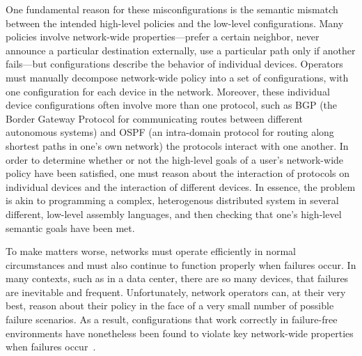 

One fundamental reason for these misconfigurations is the
semantic mismatch between the intended high-level
policies and the low-level configurations.
Many policies involve network-wide properties---prefer a certain neighbor,
never announce a particular destination externally,
use a particular path only if another fails---but configurations describe the behavior of
individual devices.
%
Operators must manually decompose network-wide policy into a set of configurations, with one configuration
for each device in the network.  Moreover, these individual device configurations often involve more than
one protocol, such as BGP (the Border Gateway Protocol for communicating routes between different
autonomous systems) and OSPF (an
intra-domain protocol for routing along shortest paths in one's own network) the protocols interact with one another.  
In order to determine whether or not the high-level goals of a user's network-wide policy have been satisfied,
one must reason about the interaction of protocols on individual devices and the interaction of different devices.
In essence, the problem is akin to programming a complex, heterogenous distributed system in several
different, low-level assembly languages, and then checking that one's high-level semantic goals have been met.

To make matters worse, networks must operate efficiently in normal circumstances and must 
also continue to function properly when failures occur.  In many contexts, such as in a data center,
there are so many devices, that failures are inevitable and frequent.  Unfortunately, network operators
can, at their very best, reason about their policy in the face of a very small number of possible failure 
scenarios.  As a result, configurations that work
correctly in failure-free environments have nonetheless been found to violate key
network-wide properties when failures occur~\cite{batfish}.



